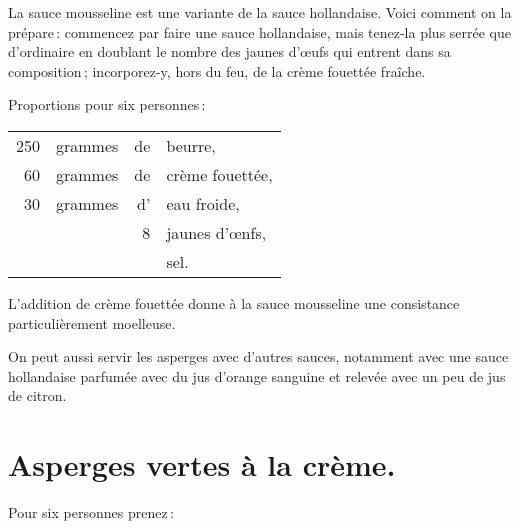 \sk

\label{pg0759} \hypertarget{p0759}{}
La sauce mousseline est une variante de la sauce hollandaise. Voici comment on
la prépare : commencez par faire une sauce hollandaise, mais tenez-la plus
serrée que d'ordinaire en doublant le nombre des jaunes d'œufs qui entrent dans
sa composition ; incorporez-y, hors du feu, de la crème fouettée fraîche.

\medskip

Proportions pour six personnes :

\footnotesize
\begin{longtable}{rrrp{16em}}
    250 & grammes & de & beurre,                                                                          \\
     60 & grammes & de & crème fouettée,                                                                  \\
     30 & grammes & d' & eau froide,                                                                      \\
        &         &  8 & jaunes d'œnfs,                                                                   \\
        &         &    & sel.                                                                             \\
\end{longtable}
\normalsize

L'addition de crème fouettée donne à la sauce mousseline une consistance
particulièrement moelleuse.

\sk

On peut aussi servir les asperges avec d'autres sauces, notamment avec une
sauce hollandaise parfumée avec du jus d'orange sanguine et relevée avec un peu
de jus de citron.

\section*{\centering Asperges vertes à la crème.}
{}
\label{pg0760} \hypertarget{p0760}{}

Pour six personnes prenez :

